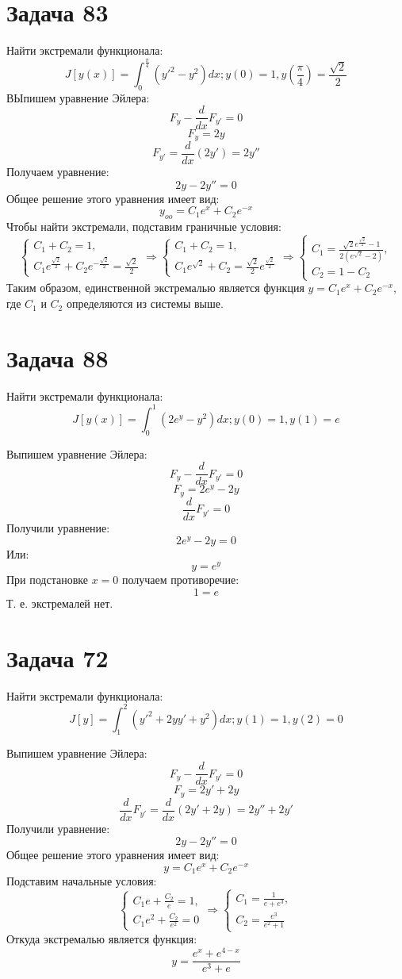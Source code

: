 \documentclass[11pt]{article}
\begin{document}
\section{Задача 83}
\label{sec:orge0cb823}
Найти экстремали функционала:
$$J[y(x)] = \int_0^{\frac{\pi}4}(y'^2 - y^2)dx; y(0) = 1, y\left(\frac{\pi}4\right) = \frac{\sqrt 2}2$$
ВЫпишем уравнение Эйлера:
$$F_y - \frac{d}{dx}F_{y'} = 0$$
$$F_y = 2y$$
$$F_{y'} = \frac{d}{dx}(2y') = 2y''$$
Получаем уравнение:
$$2y - 2y'' = 0$$
Общее решение этого уравнения имеет вид:
$$y_{oo} = C_1e^x + C_2e^{-x}$$
Чтобы найти экстремали, подставим граничные условия:
\begin{equation*}
\begin{cases}
C_1 + C_2 = 1, \\
C_1e^{\frac{\sqrt 2}2} + C_2e^{-\frac{\sqrt 2}2} = \frac{\sqrt 2}2
\end{cases}
\Rightarrow
\begin{cases}
C_1 + C_2 = 1, \\
C_1e^{\sqrt 2} + C_2 = \frac{\sqrt 2}2e^{\frac{\sqrt 2}2}
\end{cases}
\Rightarrow
\begin{cases}
C_1 = \frac{\sqrt 2e^{\frac{\sqrt 2}2} - 1}{2(e^{\sqrt 2} - 2)}, \\
C_2 = 1 - C_2
\end{cases}
\end{equation*}
Таким образом, единственной экстремалью является функция \(y = C_1e^x + C_2e^{-x}\), где \(C_1\) и \(C_2\) определяются
из системы выше.
\section{Задача 88}
\label{sec:orgf654a5a}
Найти экстремали функционала:
$$J[y(x)] = \int_0^1(2e^y - y^2)dx; y(0) = 1, y(1) = e$$

Выпишем уравнение Эйлера:
$$F_y - \frac{d}{dx}F_{y'} = 0$$
$$F_y = 2e^y - 2y$$
$$\frac{d}{dx}F_{y'} = 0$$
Получили уравнение:
$$2e^y - 2y = 0$$
Или:
$$y = e^y$$
При подстановке \(x = 0\) получаем противоречие:
$$1 = e$$
Т. е. экстремалей нет.
\section{Задача 72}
\label{sec:org1ff833e}
Найти экстремали функционала:
$$J[y] = \int_1^2(y'^2 + 2yy' + y^2)dx; y(1) = 1, y(2) = 0$$

Выпишем уравнение Эйлера:
$$F_y - \frac{d}{dx}F_{y'} = 0$$
$$F_y = 2y' + 2y$$
$$\frac{d}{dx}F_{y'} = \frac{d}{dx}(2y' + 2y) = 2y'' + 2y'$$
Получили уравнение:
$$2y - 2y'' = 0$$
Общее решение этого уравнения имеет вид:
$$y = C_1e^x + C_2e^{-x}$$
Подставим начальные условия:
\begin{equation*}
\begin{cases}
C_1e + \frac{C_2}e = 1, \\
C_1e^2 + \frac{C_2}{e^2} = 0
\end{cases}
\Rightarrow
\begin{cases}
C_1 = \frac{1}{e + e^3}, \\
C_2 = \frac{e^3}{e^2 + 1}
\end{cases}
\end{equation*}
Откуда экстремалью является функция:
$$y = \frac{e^x + e^{4 - x}}{e^3 + e}$$
\end{document}
